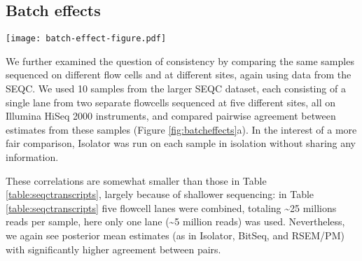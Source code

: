 \documentclass[twocolumn]{article}
\begin{document}
\subsection{Batch effects}\label{batch-effects}

\begin{figure*}
\texttt{[image: batch-effect-figure.pdf]}
\caption{
\textbf{a} A heatmap showing pairwise proportionality correlation between
samples sequenced on two flowcells each at five sites, from centrally prepared
libraries. Flowcells are numbered arbitrarily 1 or 2 and sequencing sites are
abbreviated with three letter codes: Australian Genome Research Facility (AGR),
Beijing Genome Institute (BGI), Cornell University (CNL), Mayo Clinic (MAY), and
Novartis (NVS). Median proportionality correlation is listed below each heatmap.
\textbf{b} The absolute change in correlation induced by enabling bias
correction for methods that support it. For clarity this plot excludes points
for BitSeq estimates of "MAY 2", as bias correction has an extremely detrimental
effect on these. Mean improvement in correlation was 0.008 with Salmon, 0.007
with Cufflinks, 0.006 with Isolator, 0.003 with Kallisto, 0.002 with eXpress,
and -0.164 with BitSeq.
}

\label{fig:batcheffects}
\end{figure*}

We further examined the question of consistency by comparing the same
samples sequenced on different flow cells and at different sites, again
using data from the SEQC. We used 10 samples from the larger SEQC
dataset, each consisting of a single lane from two separate
flowcells sequenced at five different sites, all on Illumina HiSeq 2000
instruments, and compared pairwise agreement between estimates from these
samples (Figure \ref{fig:batcheffects}a). In the interest of a more fair
comparison, Isolator was run on each sample in isolation without sharing
any information.

These correlations are somewhat smaller than those in Table
\ref{table:seqctranscripts}, largely because of shallower sequencing: in Table
\ref{table:seqctranscripts} five flowcell lanes were combined, totaling
\textasciitilde{}25 millions reads per sample, here only one lane
(\textasciitilde{}5 million reads) was used. Nevertheless, we again see
posterior mean estimates (as in Isolator, BitSeq, and RSEM/PM) with
significantly higher agreement between pairs.
\end{document}
